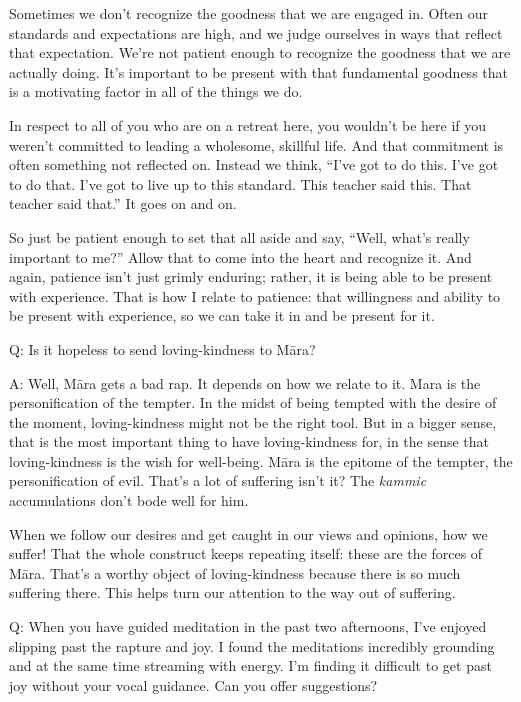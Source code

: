 Sometimes we don’t recognize the goodness that we are engaged in. Often
our standards and expectations are high, and we judge ourselves in ways
that reflect that expectation. We’re not patient enough to recognize the
goodness that we are actually doing. It’s important to be present with
that fundamental goodness that is a motivating factor in all of the
things we do.

In respect to all of you who are on a retreat here, you wouldn’t be here
if you weren’t committed to leading a wholesome, skillful life. And that
commitment is often something not reflected on. Instead we think, “I’ve
got to do this. I’ve got to do that. I’ve got to live up to this
standard. This teacher said this. That teacher said that.” It goes on
and on.

So just be patient enough to set that all aside and say, “Well, what’s
really important to me?” Allow that to come into the heart and recognize
it. And again, patience isn’t just grimly enduring; rather, it is being
able to be present with experience. That is how I relate to patience:
that willingness and ability to be present with experience, so we can
take it in and be present for it.

\qaspace
Q: Is it hopeless to send loving-kindness to Māra?

\qaspace
A: Well, Māra gets a bad rap. It depends on how we relate to it. Mara is
the personification of the tempter. In the midst of being tempted with
the desire of the moment, loving-kindness might not be the right tool.
But in a bigger sense, that is the most important thing to have
loving-kindness for, in the sense that loving-kindness is the wish for
well-being. Māra is the epitome of the tempter, the personification of
evil. That’s a lot of suffering isn’t it? The \emph{kammic}
accumulations don’t bode well for him.

When we follow our desires and get caught in our views and opinions, how
we suffer! That the whole construct keeps repeating itself: these are
the forces of Māra. That’s a worthy object of loving-kindness because
there is so much suffering there. This helps turn our attention to the
way out of suffering.

\qaspace
Q: When you have guided meditation in the past two afternoons, I’ve
enjoyed slipping past the rapture and joy. I found the meditations
incredibly grounding and at the same time streaming with energy. I’m
finding it difficult to get past joy without your vocal guidance. Can
you offer suggestions?

